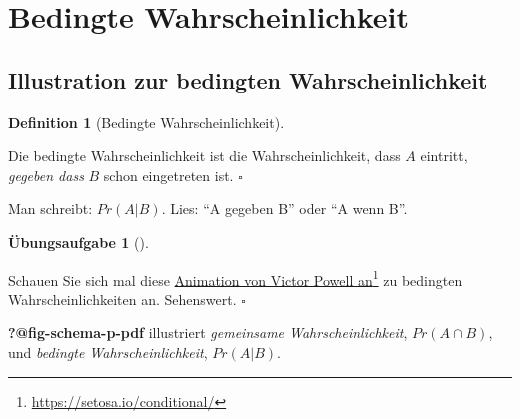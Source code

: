 \documentclass[
  ngerman,
  letterpaper,
  twoside,
  open=any]{scrbook}
\theoremstyle{definition}
\theoremstyle{plain}
\theoremstyle{definition}
\newtheorem{exercise}{Übungsaufgabe}[chapter]
\theoremstyle{definition}
\newtheorem{definition}{Definition}[chapter]
\theoremstyle{remark}
\begin{document}
\section{Bedingte Wahrscheinlichkeit}\label{bedingte-wahrscheinlichkeit}

\subsection{Illustration zur bedingten
Wahrscheinlichkeit}\label{illustration-zur-bedingten-wahrscheinlichkeit}

\begin{definition}[Bedingte
Wahrscheinlichkeit]\protect\hypertarget{def-pr-cond}{}\label{def-pr-cond}

Die bedingte Wahrscheinlichkeit ist die Wahrscheinlichkeit, dass \(A\)
eintritt, \emph{gegeben dass} \(B\) schon eingetreten ist. \(\square\)

\end{definition}

Man schreibt: \(Pr(A|B).\) Lies: \enquote{A gegeben B} oder \enquote{A
wenn B}.

\begin{exercise}[]\protect\hypertarget{exr-victorpowell}{}\label{exr-victorpowell}

Schauen Sie sich mal diese
\href{https://setosa.io/conditional/}{Animation von Victor Powell
an}\footnote{\url{https://setosa.io/conditional/}} zu bedingten
Wahrscheinlichkeiten an. Sehenswert. \(\square\)

\end{exercise}

\textbf{?@fig-schema-p-pdf} illustriert \emph{gemeinsame
Wahrscheinlichkeit}, \(Pr(A \cap B)\), und \emph{bedingte
Wahrscheinlichkeit}, \(Pr(A|B)\).
\end{document}
